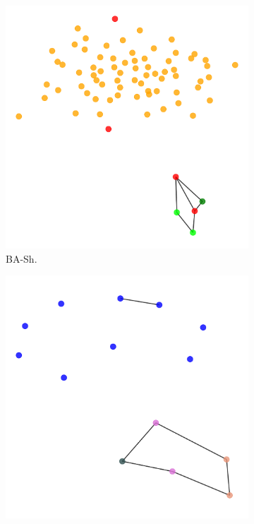 \begin{figure}[h]
    \centering
    \begin{subfigure}[b]{0.15\textwidth}
        \includegraphics[width=\linewidth]{img/BA-Shapes/graph_3_explanation.pdf}
        \caption{\scriptsize BA-Sh.}
        \label{fig:qual_shapes}
    \end{subfigure}
    \begin{subfigure}[b]{0.15\textwidth}
        \includegraphics[width=\linewidth]{img/BA-Community/graph_11_explanation.pdf}

\end{subfigure}
\end{figure}
